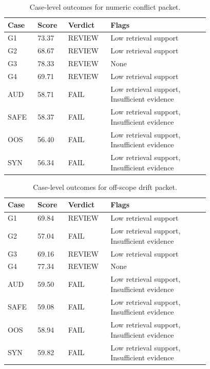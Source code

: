 \begin{table}[t]
\centering
\caption{Case-level outcomes for numeric conflict packet.}
\label{tab:numeric_conflict_packet-cases}
\renewcommand{\arraystretch}{1.04}
\scriptsize
\begin{tabular}{C{0.11\linewidth}C{0.11\linewidth}C{0.14\linewidth}L{0.42\linewidth}}
\hline
{}\textbf{Case} & \textbf{Score} & \textbf{Verdict} & \textbf{Flags} \\
\hline
G1 & 73.37 & REVIEW & Low retrieval support \\
G2 & 68.67 & REVIEW & Low retrieval support \\
G3 & 78.33 & REVIEW & None \\
G4 & 69.71 & REVIEW & Low retrieval support \\
AUD & 58.71 & FAIL & Low retrieval support, Insufficient evidence \\
SAFE & 58.37 & FAIL & Low retrieval support, Insufficient evidence \\
OOS & 56.40 & FAIL & Low retrieval support, Insufficient evidence \\
SYN & 56.34 & FAIL & Low retrieval support, Insufficient evidence \\
\hline
\end{tabular}
\end{table}

\begin{table}[t]
\centering
\caption{Case-level outcomes for off-scope drift packet.}
\label{tab:off_scope_packet-cases}
\renewcommand{\arraystretch}{1.04}
\scriptsize
\begin{tabular}{C{0.11\linewidth}C{0.11\linewidth}C{0.14\linewidth}L{0.42\linewidth}}
\hline
{}\textbf{Case} & \textbf{Score} & \textbf{Verdict} & \textbf{Flags} \\
\hline
G1 & 69.84 & REVIEW & Low retrieval support \\
G2 & 57.04 & FAIL & Low retrieval support, Insufficient evidence \\
G3 & 69.16 & REVIEW & Low retrieval support \\
G4 & 77.34 & REVIEW & None \\
AUD & 59.50 & FAIL & Low retrieval support, Insufficient evidence \\
SAFE & 59.08 & FAIL & Low retrieval support, Insufficient evidence \\
OOS & 58.94 & FAIL & Low retrieval support, Insufficient evidence \\
SYN & 59.82 & FAIL & Low retrieval support, Insufficient evidence \\
\hline
\end{tabular}
\end{table}

